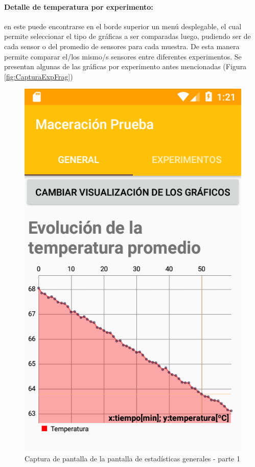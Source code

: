            \paragraph{Detalle de temperatura por experimento:} en este puede encontrarse en el borde superior un menú desplegable, el cual permite seleccionar el tipo de gráficas a ser comparadas luego, pudiendo ser de cada sensor o del promedio de sensores para cada muestra. De esta manera permite comparar el/los mismo/s sensores entre diferentes experimentos. Se presentan algunas de las gráficas por experimento antes mencionadas (Figura \ref{fig:CapturaExpFrag})
            
            \begin{figure}[h]
                \centering
                \includegraphics[scale=0.2]{software/ScreenCapture/GeneralStatistics.jpg}
                \caption{Captura de pantalla de la pantalla de estadísticas generales - parte 1}
                \label{fig:CapturaGeneralFrag-P1}
            \end{figure}
            
